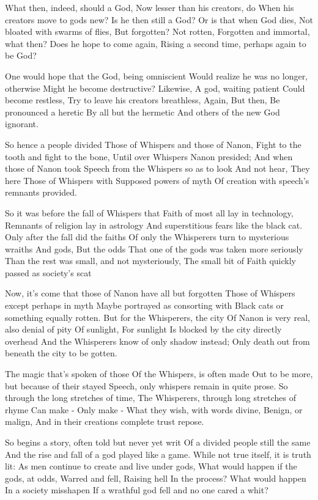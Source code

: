 What then, indeed, should a God, Now lesser than his creators, do When his creators move to gods new? Is he then still a God? Or is that when God dies, Not bloated with swarms of flies, But forgotten? Not rotten, Forgotten and immortal, what then? Does he hope to come again, Rising a second time, perhaps again to be God?

One would hope that the God, being omniscient Would realize he was no longer, otherwise Might he become destructive? Likewise, A god, waiting patient Could become restless, Try to leave his creators breathless, Again, But then, Be pronounced a heretic By all but the hermetic And others of the new God ignorant.

So hence a people divided Those of Whispers and those of Nanon, Fight to the tooth and fight to the bone, Until over Whispers Nanon presided; And when those of Nanon took Speech from the Whispers so as to look And not hear, They here Those of Whispers with Supposed powers of myth Of creation with speech's remnants provided.

So it was before the fall of Whispers that Faith of most all lay in technology, Remnants of religion lay in astrology And superstitious fears like the black cat. Only after the fall did the faiths Of only the Whisperers turn to mysterious wraiths And gods, But the odds That one of the gods was taken more seriously Than the rest was small, and not mysteriously, The small bit of Faith quickly passed as society's scat

Now, it's come that those of Nanon have all but forgotten Those of Whispers except perhaps in myth Maybe portrayed as consorting with Black cats or something equally rotten. But for the Whisperers, the city Of Nanon is very real, also denial of pity Of sunlight, For sunlight Is blocked by the city directly overhead And the Whisperers know of only shadow instead; Only death out from beneath the city to be gotten.

The magic that's spoken of those Of the Whispers, is often made Out to be more, but because of their stayed Speech, only whispers remain in quite prose. So through the long stretches of time, The Whisperers, through long stretches of rhyme Can make - Only make - What they wish, with words divine, Benign, or malign, And in their creations complete trust repose.

So begins a story, often told but never yet writ Of a divided people still the same And the rise and fall of a god played like a game. While not true itself, it is truth lit: As men continue to create and live under gods, What would happen if the gods, at odds, Warred and fell, Raising hell In the process? What would happen In a society misshapen If a wrathful god fell and no one cared a whit?


